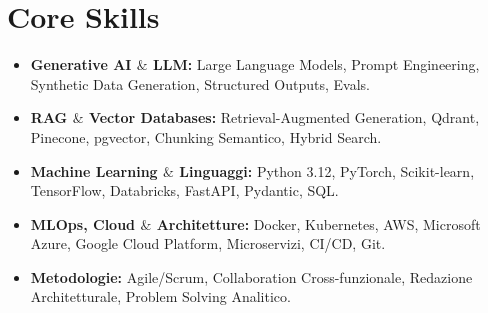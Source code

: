 \documentclass[a4paper,10pt]{article}
\begin{document}
\section{Core Skills}
\begin{itemize}
  \item \textbf{Generative AI $\&$ LLM:} Large Language Models, Prompt Engineering, Synthetic Data Generation, Structured Outputs, Evals.
  \item \textbf{RAG $\&$ Vector Databases:} Retrieval-Augmented Generation, Qdrant, Pinecone, pgvector, Chunking Semantico, Hybrid Search.
  \item \textbf{Machine Learning $\&$ Linguaggi:} Python 3.12, PyTorch, Scikit-learn, TensorFlow, Databricks, FastAPI, Pydantic, SQL.
  \item \textbf{MLOps, Cloud $\&$ Architetture:} Docker, Kubernetes, AWS, Microsoft Azure, Google Cloud Platform, Microservizi, CI/CD, Git.
  \item \textbf{Metodologie:} Agile/Scrum, Collaboration Cross-funzionale, Redazione Architetturale, Problem Solving Analitico.
\end{itemize}
\end{document}
